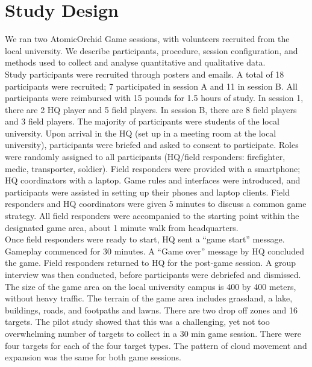 \section{Study Design}
We ran two AtomicOrchid Game sessions, with volunteers recruited from the local university. We describe participants, procedure, session configuration, and methods used to collect and analyse quantitative and qualitative data.\\

Study participants were recruited through posters and emails. A total of 18 participants were recruited; 7 participated in session A and 11 in session B. All participants were reimbursed with 15 pounds for 1.5 hours of study. In session 1, there are 2 HQ player and 5 field players. In session B, there are 8 field players and 3 field players. The majority of participants were students of the local university. Upon arrival in the HQ (set up in a meeting room at the local university), participants were briefed and asked to consent to participate. Roles were randomly assigned to all participants (HQ/field responders: firefighter, medic, transporter, soldier). Field responders were provided with a smartphone; HQ coordinators with a laptop. Game rules and interfaces were introduced, and participants were assisted in setting up their phones and laptop clients. Field responders and HQ coordinators were given 5 minutes to discuss a common game strategy. All field responders were accompanied to the starting point within the designated game area, about 1 minute walk from headquarters.\\

Once field responders were ready to start, HQ sent a ``game start'' message. Gameplay commenced for 30 minutes. A ``Game over'' message by HQ concluded the game. Field responders returned to HQ for the post-game session. A group interview was then conducted, before participants were debriefed and dismissed.\\

The size of the game area on the local university campus is 400 by 400 meters, without heavy traffic. The terrain of the game area includes grassland, a lake, buildings, roads, and footpaths and lawns. There are two drop off zones and 16 targets. The pilot study showed that this was a challenging, yet not too overwhelming number of targets to collect in a 30 min game session. There were four targets for each of the four target types. The pattern of cloud movement and expansion was the same for both game sessions.\\

